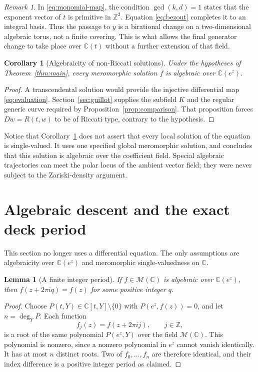 \documentclass[11pt,reqno]{amsart}
\numberwithin{equation}{section}
\newtheorem{lemma}[theorem]{Lemma}
\newtheorem{corollary}[theorem]{Corollary}
\theoremstyle{definition}
\theoremstyle{remark}
\newtheorem{remark}[theorem]{Remark}
\newcommand{\C}{\mathbb C}
\newcommand{\Z}{\mathbb Z}
\newcommand{\MM}{\mathcal M}
\begin{document}
\begin{remark}
In \eqref{eq:monomial-map}, the condition $\gcd(k,d)=1$ states that
the exponent vector of $t$ is primitive in $\Z^2$. Equation
\eqref{eq:bezout} completes it to an integral basis. Thus the passage
to $y$ is a birational change on a two-dimensional algebraic torus,
not a finite covering. This is what allows the final generator change
to take place over $\C(t)$ without a further extension of that field.
\end{remark}

\begin{corollary}[Algebraicity of non-Riccati solutions]
\label{cor:algebraicity}
Under the hypotheses of Theorem~\ref{thm:main}, every meromorphic
solution $f$ is algebraic over $\C(e^z)$.
\end{corollary}

\begin{proof}
A transcendental solution would provide the injective differential map
\eqref{eq:evaluation}. Section~\ref{sec:guillot} supplies the subfield
$K$ and the regular generic curve required by
Proposition~\ref{prop:comparison}. That proposition forces
$Dw=R(t,w)$ to be of Riccati type, contrary to the hypothesis.
\end{proof}

Notice that Corollary~\ref{cor:algebraicity} does not assert that every
local solution of the equation is single-valued. It uses one specified
global meromorphic solution, and concludes that this solution is
algebraic over the coefficient field. Special algebraic trajectories
can meet the polar locus of the ambient vector field; they were never
subject to the Zariski-density argument.

\section{Algebraic descent and the exact deck period}
\label{sec:descent}

This section no longer uses a differential equation. The only
assumptions are algebraicity over $\C(e^z)$ and meromorphic
single-valuedness on $\C$.

\begin{lemma}[A finite integer period]
\label{lem:finite-period}
If $f\in\MM(\C)$ is algebraic over $\C(e^z)$, then
$f(z+2\pi i q)=f(z)$ for some positive integer $q$.
\end{lemma}

\begin{proof}
Choose $P(t,Y)\in\C[t,Y]\setminus\{0\}$ with
$P(e^z,f(z))=0$, and let $n=\deg_Y P$. Each function
\[
 f_j(z)=f(z+2\pi i j),\qquad j\in\Z,
\]
is a root of the same polynomial $P(e^z,Y)$ over the field
$\MM(\C)$. This polynomial is nonzero, since a nonzero polynomial
in $e^z$ cannot vanish identically. It has at most $n$ distinct roots.
Two of $f_0,\ldots,f_n$ are therefore identical, and their index
difference is a positive integer period as claimed.
\end{proof}
\end{document}
